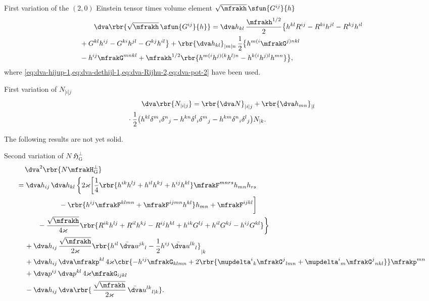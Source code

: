 \documentclass[a4paper,11pt]{article}
\begin{document}
First variation of the $(2,0)$ Einstein tensor times volume element 
$\sqrt{\mfrakh}\,\sfun{G^{ij}}{h}$
\begin{align}
&\qquad
\dva\rbr{\sqrt{\mfrakh}\,\sfun{G^{ij}}{h}}
= \dva h_{kl}\, \frac{\mfrakh^{1/2}}{2}
\big\{h^{kl}R^{ij}-R^{ki}h^{jl}-R^{kj}h^{il}
\nonumber \\
&+
G^{kl}h^{ij}-G^{ki}h^{jl}-G^{kj}h^{il} \big\} +
\rbr{\dva h_{kl}}_{|m|n}\, \frac{1}{2} \big\{ h^{m(i}\mfrakG^{j)nkl}
\nonumber \\
&-
h^{ij}\mfrakG^{mnkl} +
\mfrakh^{1/2}\rbr{h^{m(i}h^{j)(k}h^{l)n} - h^{k(i}h^{j)l}h^{mn}}\big\},
\end{align}
where \cref{eq:dva-hijup-1,eq:dva-dethijl-1,eq:dva-Rijhu-2,eq:dva-pot-2} have 
been used.

First variation of $N_{|i|j}$
\begin{align}
&\qquad
\dva \rbr{N_{|i|j}} = \rbr{\dva N}_{|i|j} + \rbr{\dva h_{mn}}_{|l}
\nonumber \\
&\cdot
\frac{1}{2}\big(h^{kl}\delta^{m}{}_{i}\delta^{n}{}_{j}-
h^{kn}\delta^{l}{}_{i}\delta^{m}{}_{j}-
h^{km}\delta^{n}{}_{i}\delta^{l}{}_{j}\big)N_{|k}.
\end{align}


The following results are not yet solid.

Second variation of $N \mfrakH_\text{G}^\perp$
\begin{align}
&\quad\,
\dva^2\rbr{N \mfrakH_\text{G}^\perp}
\nonumber \\
&= \dva h_{ij}\,\dva h_{kl}\,\bigg\{ 2\varkappa\bigg[
\frac{1}{4}\rbr{h^{ik}h^{lj}+h^{il}h^{kj}+h^{ij}h^{kl}} \mfrakF^{mnrs} 
h_{mn} h_{rs}
\nonumber \\
&\qquad\qquad\qquad
-\rbr{h^{ij}\mfrakF^{klmn}+\mfrakF^{ijmn}h^{kl}}h_{mn}
+\mfrakF^{ijkl} \bigg]
\nonumber \\
&\qquad\quad
-\frac{\sqrt{\mfrakh}}{4\varkappa}\rbr{
R^{ik}h^{lj}+R^{il}h^{kj}-R^{ij}h^{kl}+h^{ik}G^{lj}+h^{il}G^{kj}-h^{ij}G^{kl}}
\bigg\}
\nonumber \\
&\quad\,
+\dva h_{ij}\,\frac{\sqrt{\mfrakh}}{2\varkappa}
\rbr{h^{il}\,\bar{\dva}u^{jk}{}_{l}
- \frac{1}{2}h^{ij}\,\bar{\dva}u^{lk}{}_{l}}_{|k} 
\nonumber \\
&\quad\,
+\dva h_{ij}\,\dva \mfrakp^{kl}\,4\varkappa
\cbr{-h^{ij}\mfrakG_{klmn}+2\rbr{\mupdelta^i{}_k\mfrakG^{j}{}_{lmn} 
+\mupdelta^i{}_m\mfrakG^{j}{}_{nkl}} } \mfrakp^{mn}
\nonumber \\
&\quad\,
+\dva p^{ij}\,\dva p^{kl}\,4\varkappa \mfrakG_{ijkl}
\nonumber \\
&\quad\,
-\dva h_{ij}\,
\dva\rbr{\,\frac{\sqrt{\mfrakh}}{2\varkappa}\,\bar{\dva}u^{lk}{}_{l|k}}.
\end{align}
\end{document}
